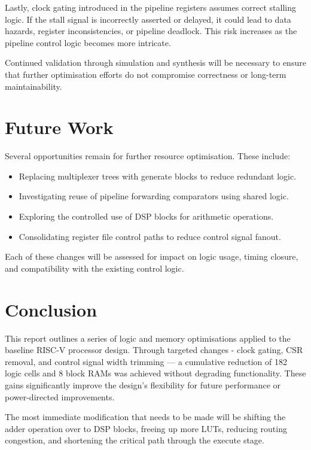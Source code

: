 \documentclass[a4paper,10pt]{article}
\begin{document}
Lastly, clock gating introduced in the pipeline registers assumes 
correct stalling logic. If the stall signal is incorrectly asserted or delayed, 
it could lead to data hazards, register inconsistencies, or pipeline deadlock. 
This risk increases as the pipeline control logic becomes more intricate.

Continued validation through simulation and synthesis will be necessary 
to ensure that further optimisation efforts do not compromise correctness 
or long-term maintainability.

\section{Future Work}
\label{sec:Future_Work}

Several opportunities remain for further resource optimisation. These include:

\begin{itemize}[noitemsep]
    \item Replacing multiplexer trees with generate blocks 
    to reduce redundant logic.
    \item Investigating reuse of pipeline 
    forwarding comparators using shared logic.
    \item Exploring the controlled use of DSP blocks for arithmetic operations.
    \item Consolidating register file control paths to reduce control signal fanout.
\end{itemize}

Each of these changes will be assessed for impact on logic usage, 
timing closure, and compatibility with the existing control logic.


\section{Conclusion}
\label{sec:Conclusion}

This report outlines a series of logic and memory optimisations applied 
to the baseline RISC-V processor design. 
Through targeted changes - clock gating, CSR removal, 
and control signal width trimming — 
a cumulative reduction of 182 logic cells and 8 block RAMs was achieved 
without degrading functionality. 
These gains significantly improve the design's flexibility 
for future performance or power-directed improvements.

The most immediate modification that needs to be made
will be shifting the adder operation over to DSP blocks,
freeing up more LUTs, reducing routing congestion,
and shortening the critical path through the execute stage.
\end{document}
